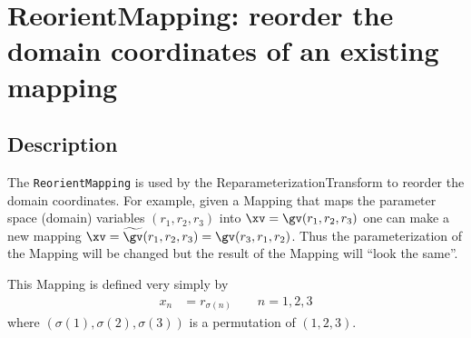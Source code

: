 \section{ReorientMapping: reorder the domain coordinates of an existing mapping}

\subsection{Description}

The {\tt ReorientMapping} is used by the ReparameterizationTransform to 
reorder the domain coordinates. For example, given a Mapping that maps the
parameter space (domain) variables $(r_1,r_2,r_3)$ into $\xv =\gv(r_1,r_2,r_3)$ one can make a 
new mapping $\xv = {\widetilde \gv}(r_1,r_2,r_3) = \gv(r_3,r_1,r_2)$. Thus the parameterization
of the Mapping will be changed but the result of the Mapping will ``look the same''.


This Mapping is defined very simply by
\begin{align*}
  x_n &= r_{\sigma(n)} \qquad n=1,2,3
\end{align*}
where $(\sigma(1),\sigma(2),\sigma(3))$ is a permutation of $(1,2,3)$.


